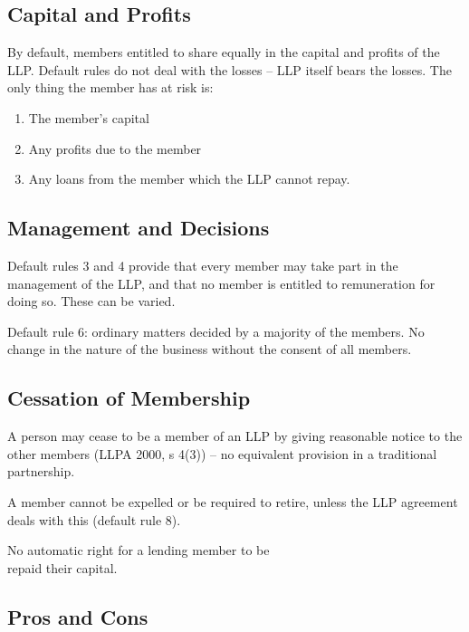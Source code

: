 \documentclass[
]{article}
\providecommand{\tightlist}{%
  \setlength{\itemsep}{0pt}\setlength{\parskip}{0pt}}
\begin{document}
\hypertarget{capital-and-profits}{%
\subsection{Capital and Profits}\label{capital-and-profits}}

By default, members entitled to share equally in the capital and profits
of the LLP. Default rules do not deal with the losses -- LLP itself
bears the losses. The only thing the member has at risk is:

\begin{enumerate}
\tightlist
\item
  The member's capital
\item
  Any profits due to the member
\item
  Any loans from the member which the LLP cannot repay.
\end{enumerate}

\hypertarget{management-and-decisions}{%
\subsection{Management and Decisions}\label{management-and-decisions}}

Default rules 3 and 4 provide that every member may take part in the
management of the LLP, and that no member is entitled to remuneration
for doing so. These can be varied.

Default rule 6: ordinary matters decided by a majority of the members.
No change in the nature of the business without the consent of all
members.

\hypertarget{cessation-of-membership}{%
\subsection{Cessation of Membership}\label{cessation-of-membership}}

A person may cease to be a member of an LLP by giving reasonable notice
to the other members (LLPA 2000, s 4(3)) -- no equivalent provision in a
traditional partnership.

A member cannot be expelled or be required to retire, unless the LLP
agreement deals with this (default rule 8).

No automatic right for a lending member to be\\
repaid their capital.

\hypertarget{pros-and-cons}{%
\subsection{Pros and Cons}\label{pros-and-cons}}
\end{document}
